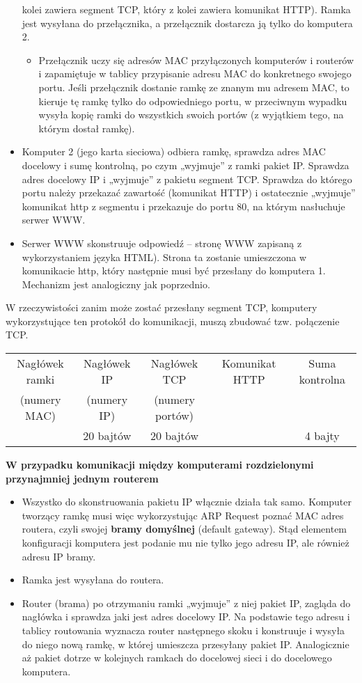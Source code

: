 \documentclass[../main.tex]{subfiles}
\begin{document}
\begin{itemize}
        kolei zawiera segment TCP, który z kolei zawiera komunikat HTTP). Ramka	jest wysyłana do przełącznika, a przełącznik dostarcza ją tylko	do komputera 2.
        \begin{itemize}
            \item Przełącznik uczy się adresów MAC przyłączonych komputerów i routerów i zapamiętuje w tablicy przypisanie adresu MAC do konkretnego swojego portu. Jeśli przełącznik dostanie ramkę ze znanym mu	 adresem MAC, to kieruje tę ramkę tylko do odpowiedniego portu, w przeciwnym wypadku wysyła kopię ramki do wszystkich swoich portów (z	wyjątkiem tego, na którym	dostał ramkę).
        \end{itemize}
        \item Komputer 2 (jego karta sieciowa) odbiera ramkę, sprawdza adres MAC docelowy i sumę kontrolną, po czym „wyjmuje” z ramki pakiet IP. Sprawdza adres docelowy IP i „wyjmuje”	z pakietu segment TCP. Sprawdza do którego portu należy przekazać zawartość (komunikat HTTP) i ostatecznie „wyjmuje” komunikat http z segmentu i przekazuje do portu 80, na którym nasłuchuje serwer WWW.
        \item Serwer WWW skonstruuje odpowiedź – stronę WWW zapisaną z wykorzystaniem języka HTML). Strona ta zostanie umieszczona w komunikacie http, który następnie musi być przesłany do komputera 1. Mechanizm jest analogiczny jak poprzednio.
    \end{itemize}
    W rzeczywistości zanim może zostać przesłany segment TCP, komputery wykorzystujące ten protokół do komunikacji, muszą zbudować tzw. połączenie TCP.


    \begin{tabular}{|c|c|c|c|c|}
        \hline
        Nagłówek ramki & Nagłówek IP & Nagłówek TCP & Komunikat HTTP & Suma kontrolna\\
        (numery MAC) & (numery IP) & (numery portów) & & \\
        & 20 bajtów & 20 bajtów & & 4 bajty\\
        \hline
    \end{tabular}

    \textbf{W przypadku komunikacji między komputerami rozdzielonymi przynajmniej jednym routerem}
    \begin{itemize}
        \item Wszystko do skonstruowania pakietu IP włącznie działa tak samo. Komputer tworzący ramkę musi więc wykorzystując ARP Request poznać
        MAC adres routera, czyli swojej \textbf{bramy domyślnej} (default gateway). Stąd elementem konfiguracji komputera jest podanie mu nie tylko
        jego adresu IP, ale również adresu IP bramy.
        \item Ramka jest wysyłana do routera.
        \item Router (brama) po otrzymaniu ramki „wyjmuje” z niej pakiet IP, zagląda do nagłówka i sprawdza jaki jest adres docelowy IP. Na podstawie
        tego adresu i tablicy routowania wyznacza router następnego skoku i konstruuje i wysyła do niego nową ramkę, w której umieszcza przesyłany pakiet IP. Analogicznie aż pakiet dotrze w kolejnych ramkach do docelowej sieci i do docelowego komputera.
    \end{itemize}
\end{document}
